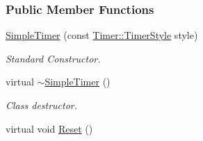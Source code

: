 \subsubsection*{Public Member Functions}
\begin{DoxyCompactItemize}
\item 
\hyperlink{classphys_1_1SimpleTimer_a3094be3aaf4cf65189604a413fa56f95}{SimpleTimer} (const \hyperlink{classphys_1_1Timer_a1ee86bf43e20329d750c5d582dcce329}{Timer::TimerStyle} style)
\begin{DoxyCompactList}\small\item\em Standard Constructor. \item\end{DoxyCompactList}\item 
\hypertarget{classphys_1_1SimpleTimer_ae7ef0b3d2b00b97d9c8a69654d9f6d74}{
virtual \hyperlink{classphys_1_1SimpleTimer_ae7ef0b3d2b00b97d9c8a69654d9f6d74}{$\sim$SimpleTimer} ()}
\label{d0/d15/classphys_1_1SimpleTimer_ae7ef0b3d2b00b97d9c8a69654d9f6d74}

\begin{DoxyCompactList}\small\item\em Class destructor. \item\end{DoxyCompactList}\item 
\hypertarget{classphys_1_1SimpleTimer_adea8d8b608e5abb96460c83f7b47f94f}{
virtual void \hyperlink{classphys_1_1SimpleTimer_adea8d8b608e5abb96460c83f7b47f94f}{Reset} ()}
\label{d0/d15/classphys_1_1SimpleTimer_adea8d8b608e5abb96460c83f7b47f94f}


\end{DoxyCompactItemize}
